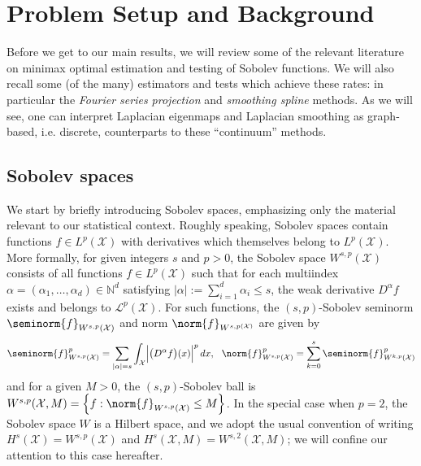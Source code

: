 \documentclass{article}
\newcommand{\abs}[1]{\left \lvert #1 \right \rvert}
\newcommand{\set}[1]{\left\{#1\right\}}
\newcommand{\1}{\mathbf{1}}
\newcommand{\Xset}{\mathcal{X}}
\newcommand{\Leb}{L}
\theoremstyle{alden}
\theoremstyle{aldenthm}
\theoremstyle{definition}
\theoremstyle{remark}
\begin{document}
\section{Problem Setup and Background}
\label{sec:problem_setup_and_background}

Before we get to our main results, we will review some of the relevant literature on minimax optimal estimation and testing of Sobolev functions. We will also recall some (of the many) estimators and tests which achieve these rates: in particular the \emph{Fourier series projection} and \emph{smoothing spline} methods. As we will see, one can interpret Laplacian eigenmaps and Laplacian smoothing as graph-based, i.e. discrete, counterparts to these ``continuum'' methods.

\subsection{Sobolev spaces}
\label{subsec:sobolev_spaces}

We start by briefly introducing Sobolev spaces, emphasizing only the material relevant to our statistical context. Roughly speaking, Sobolev spaces contain functions $f \in \Leb^p(\Xset)$ with derivatives which themselves belong to $\Leb^p(\Xset)$. More formally, for given integers $s$ and $p > 0$, the Sobolev space $W^{s,p}(\Xset)$ consists of all functions $f \in \Leb^p(\Xset)$ such that for each multiindex $\alpha = (\alpha_1,\ldots,\alpha_d) \in \mathbb{N}^d$ satisfying $\abs{\alpha} := \sum_{i = 1}^{d} \alpha_i \leq s$, the weak derivative $D^{\alpha}f$ exists and belongs to $\mathcal{L}^p(\Xset)$. For such functions, the $(s,p)$-Sobolev seminorm $\seminorm{f}_{W^{s,p}(\Xset)}$ and norm $\norm{f}_{W^{s,p(\Xset)}}$ are given by 
\begin{equation*}
\seminorm{f}_{W^{s,p}(\Xset)}^p = \sum_{\abs{\alpha} = s}\int_{\mathcal{X}} \Bigl|\bigl(D^{\alpha}f\bigr)(x)\Bigr|^p \,dx, ~~ \norm{f}_{W^{s,p}(\Xset)}^p = \sum_{k = 0}^{s} \seminorm{f}_{W^{k,p}(\Xset)}^p
\end{equation*}
and for a given $M > 0$, the $(s,p)$-Sobolev ball is $W^{s,p}(\Xset, M) = \set{f: \norm{f}_{W^{s,p}(\Xset)} \leq M}$. In the special case when $p = 2$, the Sobolev space $W$ is a Hilbert space, and we adopt the usual convention of writing $H^s(\Xset) = W^{s,p}(\Xset)$ and $H^s(\Xset,M) = W^{s,2}(\Xset,M)$; we will confine our attention to this case hereafter.
\end{document}
